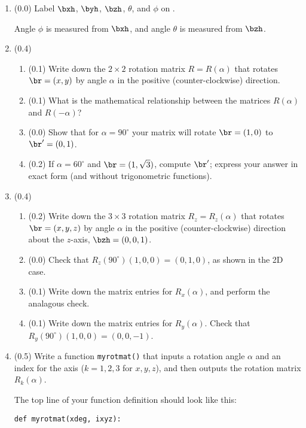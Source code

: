\documentclass[11pt,titlepage,fleqn]{article}
\newcommand{\rotangA}{\alpha}
\newcommand{\Rmat}{R}
\begin{document}
\begin{enumerate}

\item (0.0) Label $\bxh$, $\byh$, $\bzh$, $\theta$, and $\phi$ on .

Angle $\phi$ is measured from $\bxh$, and angle $\theta$ is measured from $\bzh$.

\item (0.4) 

\begin{enumerate}
\item (0.1) Write down the $2 \times 2$ rotation matrix $\Rmat = \Rmat(\rotangA)$ that rotates $\br = (x,y)$ by angle $\rotangA$ in the positive (counter-clockwise) direction.
\item (0.1) What is the mathematical relationship between the matrices $\Rmat(\rotangA)$ and $\Rmat(-\rotangA)$?
\item (0.0) Show that for $\rotangA = 90^\circ$ your matrix will rotate $\br = (1,0)$ to $\br' = (0,1)$.
\item (0.2) If $\rotangA = 60^\circ$ and $\br = (1,\sqrt{3})$, compute $\br'$; express your answer in exact form (and without trigonometric functions).
\end{enumerate}

\item (0.4)

\begin{enumerate}
\item (0.2) Write down the $3 \times 3$ rotation matrix $\Rmat_z = \Rmat_z(\rotangA)$ that rotates $\br = (x,y,z)$ by angle $\rotangA$ in the positive (counter-clockwise) direction about the $z$-axis, $\bzh = (0,0,1)$.
\item (0.0) Check that $\Rmat_z(90^\circ)(1,0,0) = (0,1,0)$, as shown in the 2D case.
\item (0.1) Write down the matrix entries for $\Rmat_x(\rotangA)$, and perform the analagous check.
\item (0.1) Write down the matrix entries for $\Rmat_y(\rotangA)$. Check that $\Rmat_y(90^\circ)(1,0,0) = (0,0,-1)$.
\end{enumerate}

\item (0.5) Write a function \verb+myrotmat()+ that inputs a rotation angle $\rotangA$ and an index for the axis ($k = 1,2,3$ for $x,y,z$), and then outputs the rotation matrix $\Rmat_k(\rotangA)$. 

The top line of your function definition should look like this:
%
\begin{verbatim}
def myrotmat(xdeg, ixyz):
\end{verbatim}


\end{enumerate}
\end{document}
